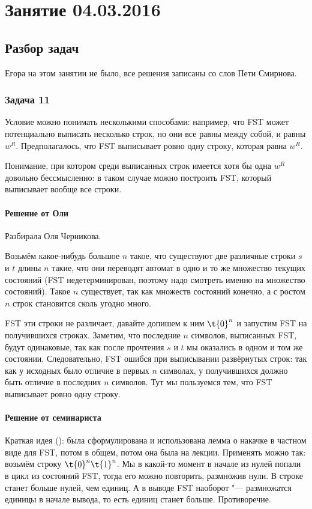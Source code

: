 \chapter{Занятие 04.03.2016}
\section{Разбор задач}

Егора на этом занятии не было, все решения записаны со слов Пети Смирнова.

\subsection{Задача 11}
	\begin{Rem}
		Условие можно понимать несколькими способами: например, что FST может потенциально выписать 
		несколько строк, но они все равны между собой, и равны $w^R$.
		Предполагалось, что FST выписывает ровно одну строку, которая равна $w^R$.

		Понимание, при котором среди выписанных строк имеется хотя бы одна $w^R$ довольно бессмысленно:
		в таком случае можно построить FST, который выписывает вообще все строки.
	\end{Rem}

	\subsubsection{Решение от Оли}
		Разбирала Оля Черникова.

		Возьмём какое-нибудь большое $n$ такое, что существуют две различные строки $s$ и $t$ длины $n$ такие,
		что они переводят автомат в одно и то же множество текущих состояний (FST недетерминирован, поэтому надо смотреть именно на множество состояний).
		Такое $n$ существует, так как множеств состояний конечно, а с ростом $n$ строк становится сколь угодно много.

		FST эти строки не различает, давайте допишем к ним $\t{0}^n$ и запустим FST на получившихся строках.
		Заметим, что последние $n$ символов, выписанных FST, будут одинаковые, так как после прочтения $s$ и $t$
		мы оказались в одном и том же состоянии.
		Следовательно, FST ошибся при выписывании развёрнутых строк: так как у исходных было отличие в первых $n$
		символах, у получившихся должно быть отличие в последних $n$ символов.
		Тут мы пользуемся тем, что FST выписывает ровно одну строку.

	\subsubsection{Решение от семинариста}
		Краткая идея (\TODO):
		была сформулирована и использована лемма о накачке в частном виде для FST, потом в общем, потом она была на лекции.
		Применять можно так: возьмём строку $\t{0}^n\t{1}^n$.
		Мы в какой-то момент в начале из нулей попали в цикл из состояний FST, тогда его можно повторить, размножив нули.
		В строке станет больше нулей, чем единиц.
		А в выводе FST наоборот "--- размножатся единицы в начале вывода, то есть единиц станет больше.
		Противоречие.

